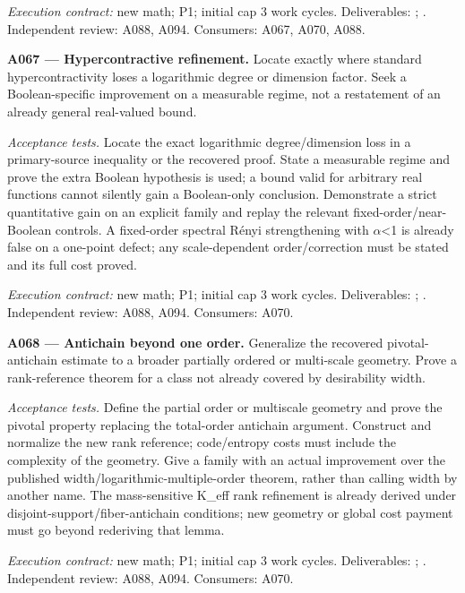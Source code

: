 \documentclass[11pt]{article}
\begin{document}
{\small\emph{Execution contract:} new math; P1; initial cap 3 work cycles. Deliverables: ; . Independent review: A088, A094. Consumers: A067, A070, A088.}

\textbf{A067 --- Hypercontractive refinement.} Locate exactly where standard hypercontractivity loses a logarithmic degree or dimension factor. Seek a Boolean-specific improvement on a measurable regime, not a restatement of an already general real-valued bound.

\emph{Acceptance tests.} Locate the exact logarithmic degree/dimension loss in a primary-source inequality or the recovered proof. State a measurable regime and prove the extra Boolean hypothesis is used; a bound valid for arbitrary real functions cannot silently gain a Boolean-only conclusion. Demonstrate a strict quantitative gain on an explicit family and replay the relevant fixed-order/near-Boolean controls. A fixed-order spectral R\'{e}nyi strengthening with $\alpha$<1 is already false on a one-point defect; any scale-dependent order/correction must be stated and its full cost proved.

{\small\emph{Execution contract:} new math; P1; initial cap 3 work cycles. Deliverables: ; . Independent review: A088, A094. Consumers: A070.}

\textbf{A068 --- Antichain beyond one order.} Generalize the recovered pivotal-antichain estimate to a broader partially ordered or multi-scale geometry. Prove a rank-reference theorem for a class not already covered by desirability width.

\emph{Acceptance tests.} Define the partial order or multiscale geometry and prove the pivotal property replacing the total-order antichain argument. Construct and normalize the new rank reference; code/entropy costs must include the complexity of the geometry. Give a family with an actual improvement over the published width/logarithmic-multiple-order theorem, rather than calling width by another name. The mass-sensitive K\_eff rank refinement is already derived under disjoint-support/fiber-antichain conditions; new geometry or global cost payment must go beyond rederiving that lemma.

{\small\emph{Execution contract:} new math; P1; initial cap 3 work cycles. Deliverables: ; . Independent review: A088, A094. Consumers: A070.}
\end{document}
